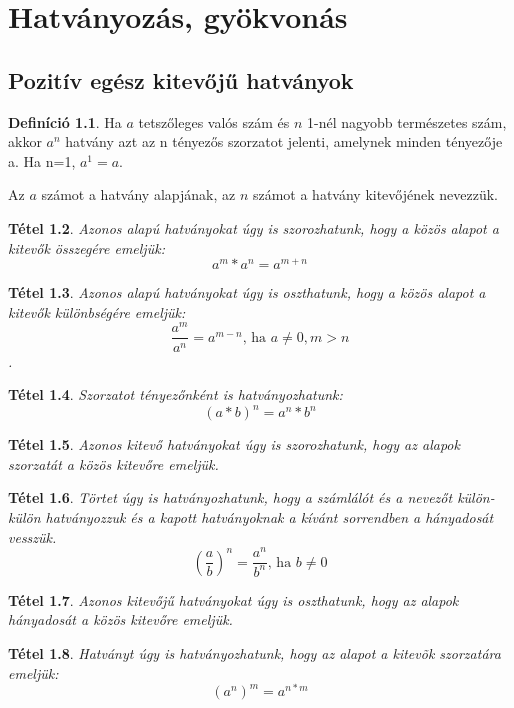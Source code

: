 \documentclass[twoside,12pt]{report}
\newtheorem{theorem}{Tétel}[section]
\theoremstyle{definition}
\newtheorem{definition}[theorem]{Definíció}
\begin{document}
\chapter{Hatványozás, gyökvonás}
\section{Pozitív egész kitevőjű hatványok}
	\begin{definition}
		Ha $a$ tetszőleges valós szám és $n$ 1-nél nagyobb természetes szám, akkor $a^n$ hatvány
		azt az n tényezős szorzatot jelenti, amelynek minden tényezője a. Ha n=1, $a^1=a$.
	\end{definition}
	Az $a$ számot a hatvány alapjának, az $n$ számot a hatvány kitevőjének nevezzük.
	\begin{theorem}
		Azonos alapú hatványokat úgy is szorozhatunk, hogy a közös alapot a kitevők összegére
		emeljük: 
		\begin{equation*}
			a^m*a^n=a^{m+n}
		\end{equation*}
	\end{theorem}
	\begin{theorem}
		Azonos alapú hatványokat úgy is oszthatunk, hogy a közös alapot a kitevők különbségére
		emeljük: 
		\begin{equation*}
			\frac{a^m}{a^n}=a^{m-n}\text{, ha } a\ne0, m>n
		\end{equation*}.
	\end{theorem}
	\begin{theorem}
		Szorzatot tényezőnként is hatványozhatunk: 
		\begin{equation*}
			(a*b)^n=a^n*b^n
		\end{equation*}
	\end{theorem}
	\begin{theorem}
		Azonos kitevő hatványokat úgy is szorozhatunk, hogy az alapok szorzatát a közös kitevőre emeljük.
	\end{theorem}
	\begin{theorem}
		Törtet úgy is hatványozhatunk, hogy a számlálót és a nevezőt külön-külön hatványozzuk
		és a kapott hatványoknak a kívánt sorrendben a hányadosát vesszük. 
		\begin{equation*}
			\left(\frac{a}{b}\right)^n=\frac{a^n}{b^n}\text{, ha }b\ne0
		\end{equation*}
	\end{theorem}
	\begin{theorem}
		Azonos kitevőjű hatványokat úgy is oszthatunk, hogy az alapok hányadosát a közös kitevőre emeljük.
	\end{theorem}
	\begin{theorem}
		Hatványt úgy is hatványozhatunk, hogy az alapot a kitevõk szorzatára emeljük:
		\begin{equation*}
			\left(a^n\right)^m=a^{n*m}
		\end{equation*}
	\end{theorem}
\end{document}
